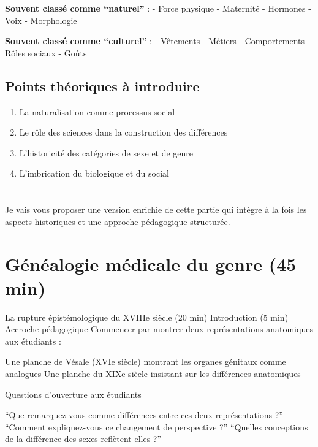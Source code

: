 \documentclass[
  letterpaper,
  DIV=11,
  numbers=noendperiod]{scrreprt}
\providecommand{\tightlist}{%
  \setlength{\itemsep}{0pt}\setlength{\parskip}{0pt}}\usepackage{longtable,booktabs,array}
\begin{document}
\textbf{Souvent classé comme ``naturel''} : - Force physique - Maternité
- Hormones - Voix - Morphologie

\textbf{Souvent classé comme ``culturel''} : - Vêtements - Métiers -
Comportements - Rôles sociaux - Goûts

\section{Points théoriques à
introduire}\label{points-thuxe9oriques-uxe0-introduire}

\begin{enumerate}
\def\labelenumi{\arabic{enumi}.}
\tightlist
\item
  La naturalisation comme processus social
\item
  Le rôle des sciences dans la construction des différences
\item
  L'historicité des catégories de sexe et de genre
\item
  L'imbrication du biologique et du social
\end{enumerate}


\chapter{}\label{section-1}

Je vais vous proposer une version enrichie de cette partie qui intègre à
la fois les aspects historiques et une approche pédagogique structurée.


\chapter{Généalogie médicale du genre (45
min)}\label{guxe9nuxe9alogie-muxe9dicale-du-genre-45-min}

La rupture épistémologique du XVIIIe siècle (20 min) Introduction (5
min) Accroche pédagogique Commencer par montrer deux représentations
anatomiques aux étudiants :

Une planche de Vésale (XVIe siècle) montrant les organes génitaux comme
analogues Une planche du XIXe siècle insistant sur les différences
anatomiques

Questions d'ouverture aux étudiants

``Que remarquez-vous comme différences entre ces deux représentations
?'' ``Comment expliquez-vous ce changement de perspective ?'' ``Quelles
conceptions de la différence des sexes reflètent-elles ?''
\end{document}
